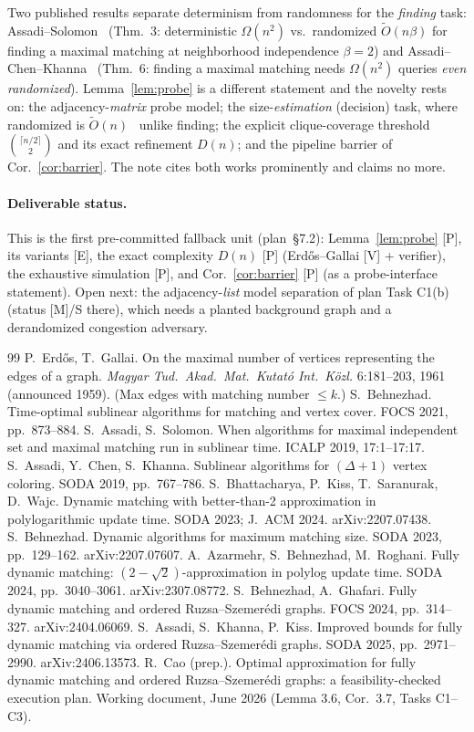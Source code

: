 \documentclass[11pt]{article}
\newcommand{\statusV}{\textsf{\footnotesize[V]}}
\newcommand{\statusP}{\textsf{\footnotesize[P]}}
\newcommand{\statusE}{\textsf{\footnotesize[E]}}
\newcommand{\statusM}{\textsf{\footnotesize[M]}}
\newcommand{\Otilde}{\widetilde{O}}
\begin{document}
Two published results separate determinism from randomness for the
\emph{finding} task: Assadi--Solomon~\cite{AS19} (Thm.~3: deterministic
$\Omega(n^2)$ vs.\ randomized $\Otilde(n\beta)$ for finding a maximal matching
at neighborhood independence $\beta=2$) and Assadi--Chen--Khanna~\cite{ACK19}
(Thm.~6: finding a maximal matching needs $\Omega(n^2)$ queries \emph{even
randomized}). Lemma~\ref{lem:probe} is a different statement and the novelty
rests on: the adjacency-\emph{matrix} probe model; the
size-\emph{estimation} (decision) task, where randomized is
$\Otilde(n)$~\cite{Beh21} unlike finding; the explicit clique-coverage
threshold $\binom{\lceil n/2\rceil}{2}$ and its exact refinement $D(n)$; and
the pipeline barrier of Cor.~\ref{cor:barrier}. The note cites both works
prominently and claims no more.

\paragraph{Deliverable status.} This is the first pre-committed fallback unit
(plan~\S7.2): Lemma~\ref{lem:probe} \statusP, its variants \statusE, the exact
complexity $D(n)$ \statusP{} (Erd\H{o}s--Gallai \statusV{} + verifier), the
exhaustive simulation \statusP, and Cor.~\ref{cor:barrier} \statusP{} (as a
probe-interface statement). Open next: the adjacency-\emph{list} model
separation of plan Task C1(b) (status \statusM/S there), which needs a planted
background graph and a derandomized congestion adversary.

\begin{thebibliography}{99}\footnotesize
{} P.~Erd\H{o}s, T.~Gallai. On the maximal number of vertices
representing the edges of a graph. \emph{Magyar Tud.\ Akad.\ Mat.\ Kutat\'o
Int.\ K\"ozl.} 6:181--203, 1961 (announced 1959). (Max edges with matching
number $\le k$.)
 S.~Behnezhad. Time-optimal sublinear algorithms for matching
and vertex cover. FOCS 2021, pp.~873--884.
 S.~Assadi, S.~Solomon. When algorithms for maximal independent
set and maximal matching run in sublinear time. ICALP 2019, 17:1--17:17.
 S.~Assadi, Y.~Chen, S.~Khanna. Sublinear algorithms for
$(\Delta+1)$ vertex coloring. SODA 2019, pp.~767--786.
 S.~Bhattacharya, P.~Kiss, T.~Saranurak, D.~Wajc. Dynamic
matching with better-than-2 approximation in polylogarithmic update time. SODA
2023; J.~ACM 2024. arXiv:2207.07438.
 S.~Behnezhad. Dynamic algorithms for maximum matching size.
SODA 2023, pp.~129--162. arXiv:2207.07607.
 A.~Azarmehr, S.~Behnezhad, M.~Roghani. Fully dynamic matching:
$(2-\sqrt2)$-approximation in polylog update time. SODA 2024, pp.~3040--3061.
arXiv:2307.08772.
 S.~Behnezhad, A.~Ghafari. Fully dynamic matching and ordered
Ruzsa--Szemer\'edi graphs. FOCS 2024, pp.~314--327. arXiv:2404.06069.
 S.~Assadi, S.~Khanna, P.~Kiss. Improved bounds for fully
dynamic matching via ordered Ruzsa--Szemer\'edi graphs. SODA 2025,
pp.~2971--2990. arXiv:2406.13573.
 R.~Cao (prep.). Optimal approximation for fully dynamic matching
and ordered Ruzsa--Szemer\'edi graphs: a feasibility-checked execution plan.
Working document, June 2026 (Lemma 3.6, Cor.~3.7, Tasks C1--C3).
\end{thebibliography}
\end{document}
